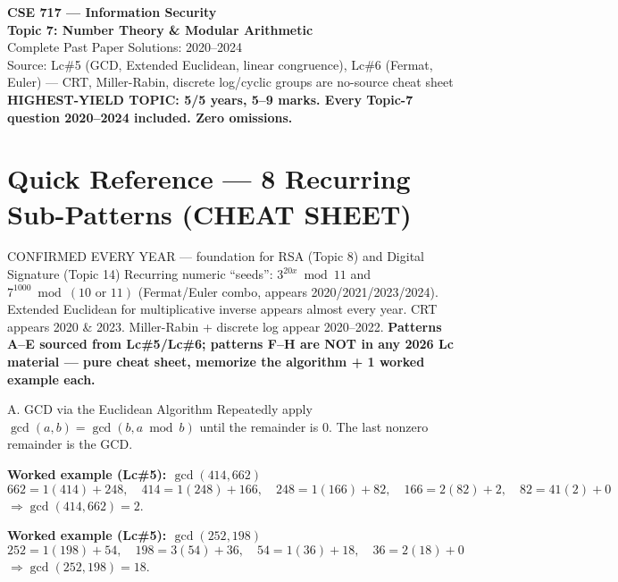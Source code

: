 \documentclass[12pt,a4paper]{article}
\begin{document}
\begin{center}
{\LARGE\bfseries\color{folblue} CSE 717 --- Information Security}\\[4pt]
{\large\bfseries Topic 7: Number Theory \& Modular Arithmetic}\\[2pt]
{\large Complete Past Paper Solutions: 2020--2024}\\[6pt]
{\normalsize Source: Lc\#5 (GCD, Extended Euclidean, linear congruence), Lc\#6 (Fermat, Euler) --- CRT, Miller-Rabin, discrete log/cyclic groups are no-source cheat sheet}\\[2pt]
{\normalsize\color{darkred}\textbf{HIGHEST-YIELD TOPIC: 5/5 years, 5--9 marks. Every Topic-7 question 2020--2024 included. Zero omissions.}}
\end{center}

\tableofcontents
\newpage

\section*{Quick Reference --- 8 Recurring Sub-Patterns (CHEAT SHEET)}

\begin{warnbox}{CONFIRMED EVERY YEAR --- foundation for RSA (Topic 8) and Digital Signature (Topic 14)}
Recurring numeric ``seeds'': $3^{20x} \bmod 11$ and $7^{1000} \bmod (10 \text{ or } 11)$ (Fermat/Euler combo, appears 2020/2021/2023/2024). Extended Euclidean for multiplicative inverse appears almost every year. CRT appears 2020 \& 2023. Miller-Rabin + discrete log appear 2020--2022. \textbf{Patterns A--E sourced from Lc\#5/Lc\#6; patterns F--H are NOT in any 2026 Lc material --- pure cheat sheet, memorize the algorithm + 1 worked example each.}
\end{warnbox}

\begin{algobox}{A. GCD via the Euclidean Algorithm}
Repeatedly apply $\gcd(a,b) = \gcd(b, a \bmod b)$ until the remainder is 0. The last nonzero remainder is the GCD.

\textbf{Worked example (Lc\#5): $\gcd(414,662)$}
\[
662 = 1(414)+248,\quad 414=1(248)+166,\quad 248=1(166)+82,\quad 166=2(82)+2,\quad 82=41(2)+0
\]
$\Rightarrow \gcd(414,662)=2$.

\textbf{Worked example (Lc\#5): $\gcd(252,198)$}
\[
252=1(198)+54,\quad 198=3(54)+36,\quad 54=1(36)+18,\quad 36=2(18)+0
\]
$\Rightarrow \gcd(252,198)=18$.
\end{algobox}
\end{document}

